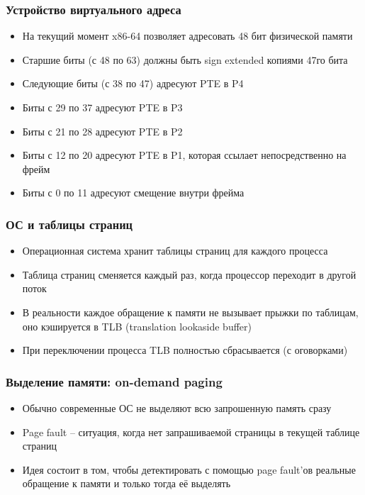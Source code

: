   \subsubsection{Устройство виртуального адреса}
    \begin{itemize}
      \item На текущий момент x86-64 позволяет адресовать 48 бит физической памяти
      \item Старшие биты (с 48 по 63) должны быть sign extended копиями 47го бита
      \item Следующие биты (с 38 по 47) адресуют PTE в P4
      \item Биты с 29 по 37 адресуют PTE в P3
      \item Биты с 21 по 28 адресуют PTE в P2
      \item Биты с 12 по 20 адресуют PTE в P1, которая ссылает непосредственно на фрейм
      \item Биты с 0 по 11 адресуют смещение внутри фрейма
    \end{itemize}
  
    \subsubsection{ОС и таблицы страниц}
      \begin{itemize}
        \item Операционная система хранит таблицы страниц для каждого процесса
        \item Таблица страниц сменяется каждый раз, когда процессор переходит в другой поток
        \item В реальности каждое обращение к памяти не вызывает прыжки по таблицам, оно кэшируется в TLB (translation lookaside buffer)
        \item При переключении процесса TLB полностью сбрасывается (с оговорками)
      \end{itemize}
    
    \subsubsection{Выделение памяти: on-demand paging}
      \begin{itemize}
        \item Обычно современные ОС не выделяют всю запрошенную память сразу
        \item Page fault -- ситуация, когда нет запрашиваемой страницы в текущей таблице страниц
        \item Идея состоит в том, чтобы детектировать с помощью page fault'ов реальные обращение к памяти и только тогда её выделять
      \end{itemize}
    
